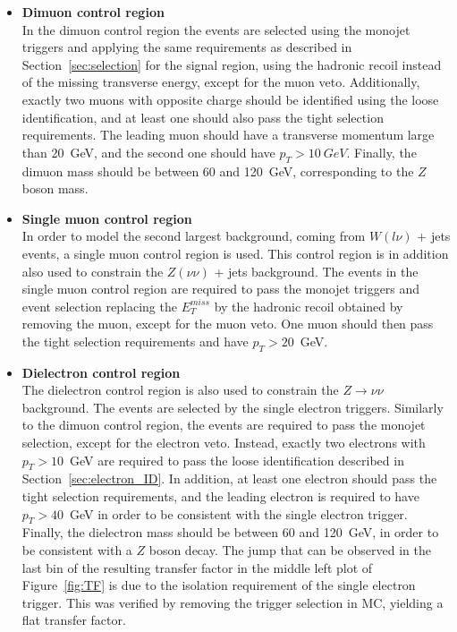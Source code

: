 \begin{itemize}
 \item[] \textbf{Dimuon control region}\\ In the dimuon control region the events are selected using the monojet triggers and applying the same requirements as described in Section~\ref{sec:selection} for the signal region, using the hadronic recoil instead of the missing transverse energy, except for the muon veto. Additionally, exactly two muons with opposite charge should be identified using the loose identification, and at least one should also pass the tight selection requirements. The leading muon should have a transverse momentum large than \SI{20}{GeV}, and the second one should have $p_T > \SI{10}{GeV}$. Finally, the dimuon mass should be between 60 and \SI{120}{GeV}, corresponding to the $Z$ boson mass.

\item[] \textbf{Single muon control region}\\ In order to model the second largest background, coming from $W(l\nu)$ + jets events, a single muon control region is used. This control region is in addition also used to constrain the $Z(\nu\nu)$ + jets background. The events in the single muon control region are required to pass the monojet triggers and event selection replacing the $E_T^{miss}$ by the hadronic recoil obtained by removing the muon, except for the muon veto. One muon should then pass the tight selection requirements and have $p_T > 20$~GeV.

\item[] \textbf{Dielectron control region}\\ The dielectron control region is also used to constrain the $Z\rightarrow\nu\nu$ background. The events are selected by the single electron triggers. Similarly to the dimuon control region, the events are required to pass the monojet selection, except for the electron veto. Instead, exactly two electrons with $p_T > 10$~GeV are required to pass the loose identification described in Section~\ref{sec:electron_ID}. In addition, at least one electron should pass the tight selection requirements, and the leading electron is required to have $p_T > 40$~GeV in order to be consistent with the single electron trigger. Finally, the dielectron mass should be between 60 and 120~GeV, in order to be consistent with a $Z$ boson decay. The jump that can be observed in the last bin of the resulting transfer factor in the middle left plot of Figure~\ref{fig:TF} is due to the isolation requirement of the single electron trigger. This was verified by removing the trigger selection in MC, yielding a flat transfer factor.


\end{itemize}
